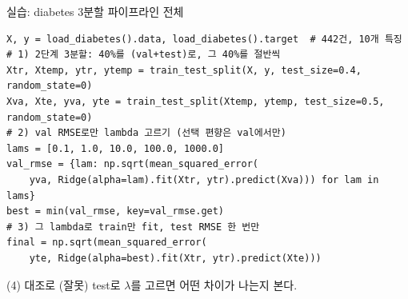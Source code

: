 \begin{frame}[fragile]{실습: diabetes 3분할 파이프라인 전체}
  \small
\begin{lstlisting}
X, y = load_diabetes().data, load_diabetes().target  # 442건, 10개 특징
# 1) 2단계 3분할: 40%를 (val+test)로, 그 40%를 절반씩
Xtr, Xtemp, ytr, ytemp = train_test_split(X, y, test_size=0.4, random_state=0)
Xva, Xte, yva, yte = train_test_split(Xtemp, ytemp, test_size=0.5, random_state=0)
# 2) val RMSE로만 lambda 고르기 (선택 편향은 val에서만)
lams = [0.1, 1.0, 10.0, 100.0, 1000.0]
val_rmse = {lam: np.sqrt(mean_squared_error(
    yva, Ridge(alpha=lam).fit(Xtr, ytr).predict(Xva))) for lam in lams}
best = min(val_rmse, key=val_rmse.get)
# 3) 그 lambda로 train만 fit, test RMSE 한 번만
final = np.sqrt(mean_squared_error(
    yte, Ridge(alpha=best).fit(Xtr, ytr).predict(Xte)))
\end{lstlisting}
  (4) 대조로 (잘못) test로 $\lambda$를 고르면 어떤 차이가 나는지 본다.
\end{frame}
